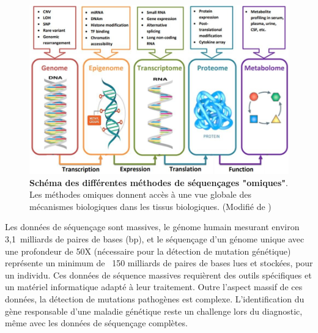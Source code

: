 \begin{figure}[htbp]
 \centering
 \includegraphics[width=1\textwidth]{figures/intro_omics.png}
 \caption[Méthodes de séquençages "omiques"]{\textbf{Schéma des différentes méthodes de séquençages "omiques"}. Les méthodes omiques donnent accès à une vue globale des mécanismes biologiques dans les tissus biologiques. (Modifié de \cite{momeni_survey_2020})}
 \label{fig:intro-omics}
\end{figure}

Les données de séquençage sont massives, le génome humain mesurant environ 3,1~milliards de paires de bases (bp), et le séquençage d'un génome unique avec une profondeur de 50X (nécessaire pour la détection de mutation génétique) représente un minimum de ~150 milliards de paires de bases lues et stockées, pour un individu. Ces données de séquence massives requièrent des outils spécifiques et un matériel informatique adapté à leur traitement. Outre l'aspect massif de ces données, la détection de mutations pathogènes est complexe. L'identification du gène responsable d'une maladie génétique reste un challenge lors du diagnostic, même avec les données de séquençage complètes.

